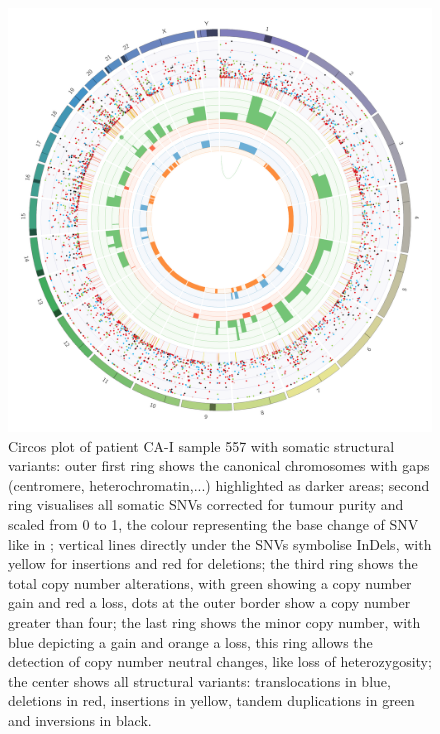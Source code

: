 \begin{figure}[ht]
\centering
\includegraphics[width=.99\linewidth]{Figures/CASCADE/CA51/CA51-557.circos.png}
\caption[Circos plot of patient CA-I sample 557]{Circos plot of patient CA-I sample 557 with somatic structural variants: outer first ring shows the canonical chromosomes with gaps (centromere, heterochromatin,...) highlighted as darker areas; second ring visualises all somatic SNVs corrected for tumour purity and scaled from 0 to 1, the colour representing the base change of SNV like in \protect\textcite{Alexandrov2013}; vertical lines directly under the SNVs symbolise InDels, with yellow for insertions and red for deletions; the third ring shows the total copy number alterations, with green showing a copy number gain and red a loss, dots at the outer border show a copy number greater than four; the last ring shows the minor copy number, with blue depicting a gain and orange a loss, this ring allows the detection of copy number neutral changes, like loss of heterozygosity; the center shows all structural variants: translocations in blue, deletions in red, insertions in yellow, tandem duplications in green and inversions in black.} \label{fig:ca51.557circos}
\end{figure}



